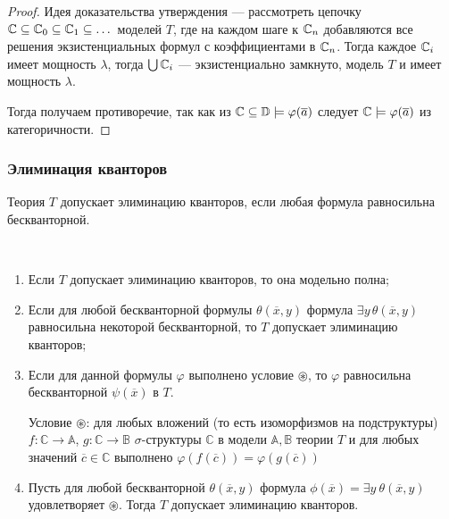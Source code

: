\begin{proof}
    Идея доказательства утверждения — рассмотреть цепочку ${\mathbb C}\subseteq{\mathbb C}_0\subseteq {\mathbb C}_1\subseteq \dots$ моделей $T$, где на каждом шаге к ${\mathbb C}_n$ добавляются все решения экзистенциальных формул с коэффициентами в ${\mathbb C}_n$. Тогда каждое ${\mathbb C}_i$ имеет мощность $\lambda$, тогда $\bigcup {\mathbb C}_i$ — экзистенциально замкнуто, модель $T$ и имеет мощность $\lambda$.

    Тогда получаем противоречие, так как из ${\mathbb C}\subseteq \mathbb{D}\models\varphi(\overline{a})$ следует ${\mathbb C}\models \varphi(\overline{a})$ из категоричности.
\end{proof}




\subsubsection{Элиминация кванторов}
\begin{definition}
    Теория $T$ допускает элиминацию кванторов, если любая формула равносильна бескванторной.
\end{definition}

\begin{prop}\
    \begin{enumerate}
        \item Если $T$ допускает элиминацию кванторов, то она модельно полна;

        \item Если для любой бескванторной формулы $\theta(\overline{x}, y)$ формула $\exists y\, \theta(\overline{x}, y)$ равносильна некоторой бескванторной, то $T$ допускает элиминацию кванторов;

        \item Если для данной формулы $\varphi$ выполнено условие $\circledast$, то $\varphi$ равносильна бескванторной $\psi(\overline{x})$ в $T$.

            Условие $\circledast$: для любых вложений (то есть изоморфизмов на подструктуры) $f: \mathbb{C} \rightarrow \mathbb{A}$, $g: \mathbb{C} \rightarrow \mathbb{B}$ $\sigma$-структуры $\mathbb{C}$ в модели $\mathbb{A}, \mathbb{B}$ теории $T$ и для любых значений $\overline{c}\in\mathbb{C}$  выполнено $\varphi(f(\overline{c}))=\varphi(g(\overline{c}))$  

        \item Пусть для любой бескванторной $\theta(\overline{x}, y)$ формула $\phi(\overline{x}) = \exists y~\theta(\overline{x}, y)$ удовлетворяет $\circledast$. Тогда $T$ допускает элиминацию кванторов.
    \end{enumerate}
\end{prop}


